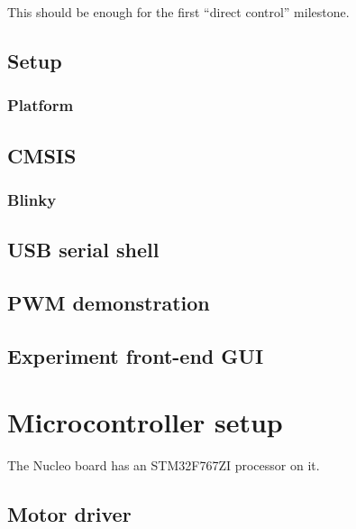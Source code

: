 \documentclass[a4paper,11pt,article]{memoir}
\begin{document}
This should be enough for the first ``direct control'' milestone.


\subsection{Setup}

\subsubsection{Platform}


\subsection{CMSIS}


\subsubsection{Blinky}


\subsection{USB serial shell}


\subsection{PWM demonstration}


\subsection{Experiment front-end GUI}


\section{Microcontroller setup}

The Nucleo board has an STM32F767ZI processor on it.

\subsection{Motor driver}
\end{document}
